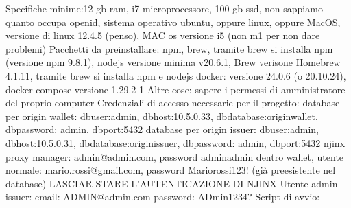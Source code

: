 Specifiche minime:12 gb ram, i7 microprocessore, 100 gb ssd, non sappiamo quanto occupa openid, sistema operativo ubuntu, oppure linux, oppure MacOS, versione di linux 12.4.5 (penso), MAC os versione i5 (non m1 per non dare problemi)
Pacchetti da preinstallare: npm, brew, tramite brew si installa npm (versione npm 9.8.1), nodejs versione minima v20.6.1, Brew verisone Homebrew 4.1.11, tramite brew si installa npm e nodejs
    docker: versione 24.0.6 (o 20.10.24), docker compose versione 1.29.2-1
Altre cose: sapere i permessi di amministratore del proprio computer
Credenziali di accesso necessarie per il progetto:
    database per origin wallet: dbuser:admin, dbhost:10.5.0.33, dbdatabase:originwallet, dbpassword: admin, dbport:5432
    database per origin issuer: dbuser:admin, dbhost:10.5.0.31, dbdatabase:originissuer, dbpassword: admin, dbport:5432
    njinx proxy manager: admin@admin.com, password adminadmin
        dentro wallet, utente normale: mario.rossi@gmail.com, password Mariorossi123! (già preesistente nel database)
        LASCIAR STARE L'AUTENTICAZIONE DI NJINX
Utente admin issuer:
    email: ADMIN@admin.com
    password: ADmin1234?
Script di avvio:
